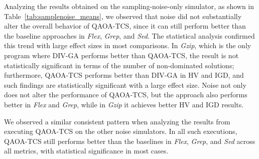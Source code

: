 Analyzing the results obtained on the sampling-noise-only simulator, as shown in Table~\ref{tab:samplenoise_means}, we observed that noise did not substantially alter the overall behavior of \textsc{QAOA-TCS}, since it can still perform better than the baseline approaches in \textit{Flex}, \textit{Grep}, and \textit{Sed}. The statistical analysis confirmed this trend with large effect sizes in most comparisons. In \textit{Gzip}, which is the only program where \textsc{DIV-GA} performs better than \textsc{QAOA-TCS}, the result is not statistically significant in terms of the number of non-dominated solutions; furthermore, \textsc{QAOA-TCS} performs better than \textsc{DIV-GA} in HV and IGD, and such findings are statistically significant with a large effect size. Noise not only does not alter the performance of \textsc{QAOA-TCS}, but the approach also performs better in \textit{Flex} and \textit{Grep}, while in \textit{Gzip} it achieves better HV and IGD results.

We observed a similar consistent pattern when analyzing the results from executing \textsc{QAOA-TCS} on the other noise simulators. In all such executions, \textsc{QAOA-TCS} still performs better than the baselines in \textit{Flex}, \textit{Grep}, and \textit{Sed} across all metrics, with statistical significance in most cases.


